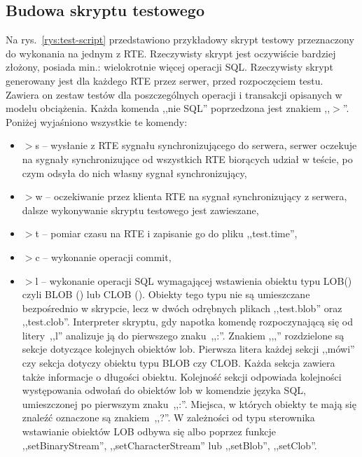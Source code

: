 \subsection{Budowa skryptu testowego}\label{sub:testscript}
Na rys.~\ref{rys:test-script} przedstawiono przykładowy skrypt testowy przeznaczony do wykonania na jednym z RTE. 
Rzeczywisty skrypt jest oczywiście bardziej złożony, posiada min.: wielokrotnie więcej operacji SQL. 
Rzeczywisty skrypt generowany jest dla każdego RTE przez serwer, przed rozpoczęciem testu.
Zawiera on zestaw testów dla poszczególnych operacji i transakcji opisanych w modelu obciążenia. Każda 
komenda ,,nie SQL'' poprzedzona jest znakiem ,,$>$''. Poniżej wyjaśniono wszystkie te komendy:
\begin{itemize}
\item $>$s -- wysłanie z RTE sygnału synchronizującego do serwera, serwer oczekuje na sygnały synchronizujące od
wszystkich RTE biorących udział w teście, po czym odsyła do nich własny sygnał synchronizujący,
\item $>$w -- oczekiwanie przez klienta RTE na sygnał synchronizujący z serwera, dalsze wykonywanie skryptu testowego jest
zawieszane,
\item $>$t -- pomiar czasu na RTE i zapisanie go do pliku ,,test.time'',
\item $>$c -- wykonanie operacji commit,
\item $>$l -- wykonanie operacji SQL wymagającej wstawienia obiektu typu LOB() 
czyli BLOB () lub CLOB (). 
Obiekty tego typu nie są umieszczane bezpośrednio w skrypcie, lecz w 
dwóch odrębnych plikach ,,test.blob'' oraz ,,test.clob''. Interpreter skryptu, 
gdy napotka komendę rozpoczynającą się od litery~,,l'' analizuje ją do pierwszego znaku~,,:''. 
Znakiem ,,,'' rozdzielone są sekcje dotyczące kolejnych obiektów lob. 
Pierwsza litera każdej sekcji ,,mówi'' czy sekcja dotyczy obiektu typu BLOB czy CLOB. 
Każda sekcja zawiera także informacje o długości obiektu. Kolejność sekcji odpowiada kolejności
występowania odwołań do obiektów lob w komendzie języka SQL, umieszczonej po pierwszym znaku~,,:''. 
Miejsca, w których obiekty te mają się znaleźć oznaczone są znakiem~,,?''. 
W zależności od typu sterownika wstawianie obiektów LOB odbywa się albo poprzez funkcje 
,,setBinaryStream'', ,,setCharacterStream'' lub ,,setBlob'', ,,setClob''.
\end{itemize} 

